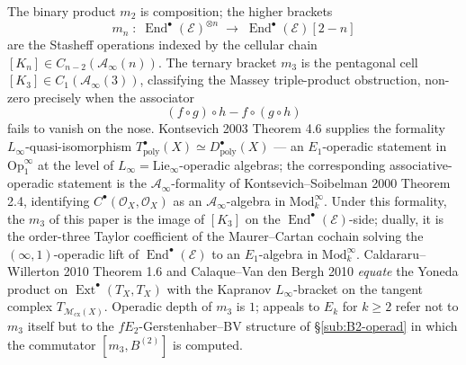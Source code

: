 \documentclass[11pt,reqno]{amsart}
\theoremstyle{plain}
\theoremstyle{definition}
\theoremstyle{remark}
\DeclareMathOperator{\Ext}{Ext}
\DeclareMathOperator{\End}{End}
\newcommand{\cM}{\mathcal{M}}
\newcommand{\cO}{\mathcal{O}}
\newcommand{\cA}{\mathcal{A}}
\newcommand{\cE}{\mathcal{E}}
\begin{document}
The binary product $m_2$ is composition; the higher brackets
\[
  m_n \;:\; \End^\bullet(\cE)^{\otimes n} \;\longrightarrow\; \End^\bullet(\cE)[2 - n]
\]
are the Stasheff operations indexed by the cellular chain $[K_n] \in C_{n-2}(\cA_\infty(n))$. The ternary bracket $m_3$ is the pentagonal cell $[K_3] \in C_1(\cA_\infty(3))$, classifying the Massey triple-product obstruction, non-zero precisely when the associator
\[
  (f \circ g) \circ h - f \circ (g \circ h)
\]
fails to vanish on the nose. Kontsevich 2003 Theorem 4.6 supplies the formality $L_\infty$-quasi-isomorphism $T^\bullet_{\mathrm{poly}}(X) \simeq D^\bullet_{\mathrm{poly}}(X)$ --- an $E_1$-operadic statement in $\mathrm{Op}^\infty_1$ at the level of $L_\infty = \mathrm{Lie}_\infty$-operadic algebras; the corresponding associative-operadic statement is the $\cA_\infty$-formality of Kontsevich--Soibelman 2000 Theorem 2.4, identifying $C^\bullet(\cO_X, \cO_X)$ as an $\cA_\infty$-algebra in $\mathrm{Mod}_k^\infty$. Under this formality, the $m_3$ of this paper is the image of $[K_3]$ on the $\End^\bullet(\cE)$-side; dually, it is the order-three Taylor coefficient of the Maurer--Cartan cochain solving the $(\infty,1)$-operadic lift of $\End^\bullet(\cE)$ to an $E_1$-algebra in $\mathrm{Mod}_k^\infty$. Caldararu--Willerton 2010 Theorem 1.6 and Calaque--Van den Bergh 2010 \emph{equate} the Yoneda product on $\Ext^\bullet(T_X, T_X)$ with the Kapranov $L_\infty$-bracket on the tangent complex $T_{\cM_{\mathrm{cx}}(X)}$. Operadic depth of $m_3$ is $1$; appeals to $E_k$ for $k \geq 2$ refer not to $m_3$ itself but to the $fE_2$-Gerstenhaber--BV structure of \S\ref{sub:B2-operad} in which the commutator $[m_3, B^{(2)}]$ is computed.
\end{document}
